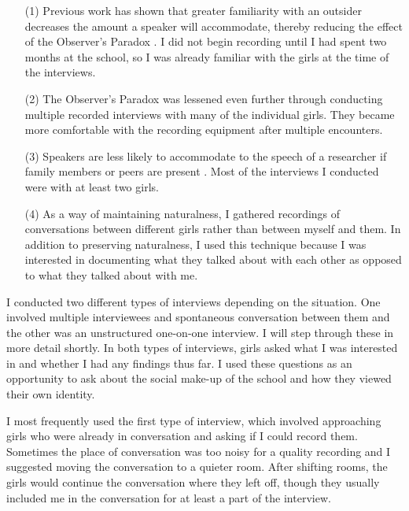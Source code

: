 \begin{enumerate}

\item[(1)] Previous work has shown that greater familiarity with an outsider decreases the amount a speaker will accommodate, thereby reducing the effect of the Observer's Paradox \cite{cukoravilabailey}. I did not begin recording until I had spent two months at the school, so I was already familiar with the girls at the time of the interviews.

\item[(2)]  The Observer's Paradox was lessened even further through conducting multiple recorded interviews with many of the individual girls.  They became more comfortable with the recording equipment after multiple encounters.  

\item[(3)] Speakers are less likely to accommodate to the speech of a researcher if family members or peers are present \cite[115]{labov1972principles}.  Most of the interviews I conducted were with at least two girls.

\item[(4)]  As a way of maintaining naturalness, I gathered recordings of conversations between different girls rather than between myself and them.  In addition to preserving naturalness, I used this technique because I was interested in documenting what they talked about with each other as opposed to what they talked about with me. 
\end{enumerate}

\noindent I conducted two different types of interviews depending on the situation.  One involved multiple interviewees and spontaneous conversation between them and the other was an unstructured one-on-one interview.  I will step through these in more detail shortly.  In both types of interviews, girls asked what I was interested in and whether I had any findings thus far.  I used these questions as an opportunity to ask about the social make-up of the school and how they viewed their own identity.  

I most frequently used the first type of interview, which involved approaching girls who were already in conversation and asking if I could record them.  Sometimes the place of conversation was too noisy for a quality recording and I suggested moving the conversation to a quieter room.  After shifting rooms, the girls would continue the conversation where they left off, though they usually included me in the conversation for at least a part of the interview.   

